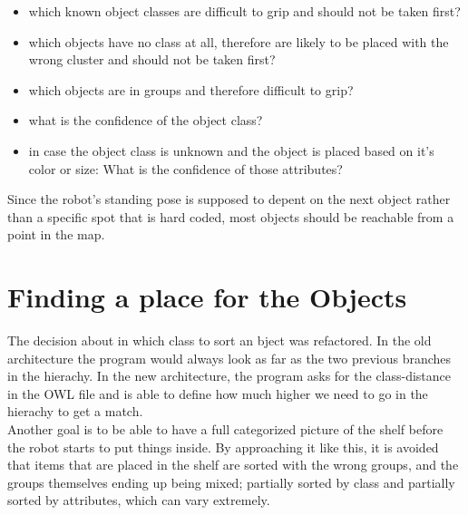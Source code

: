 \documentclass[main.tex]{subfiles}
\begin{document}
\begin{itemize}
\item which known object classes are difficult to grip and should not be taken first?
\item which objects have no class at all, therefore are likely to be placed with the wrong cluster and should not be taken first?
\item which objects are in groups and therefore difficult to grip?
\item what is the confidence of the object class?
\item in case the object class is unknown and the object is placed based on it's color or size: What is the confidence of those attributes?
\end{itemize}

Since the robot's standing pose is supposed to depent on the next object rather than a specific spot that is hard coded, most objects should be reachable from a point in the map. 

		\section{Finding a place for the Objects}
		The decision about in which class to sort an bject was refactored. In the old architecture the program would always look as far as the two previous branches in the hierachy. In the new architecture, the program asks for the class-distance in the OWL file and is able to define how much higher we need to go in the hierachy to get a match.\\
Another goal is to be able to have a full categorized picture of the shelf before the robot starts to put things inside. By approaching it like this, it is avoided that items that are placed in the shelf are sorted with the wrong groups, and the groups themselves ending up being mixed; partially sorted by class and partially sorted by attributes, which can vary extremely.
 
\end{document}
